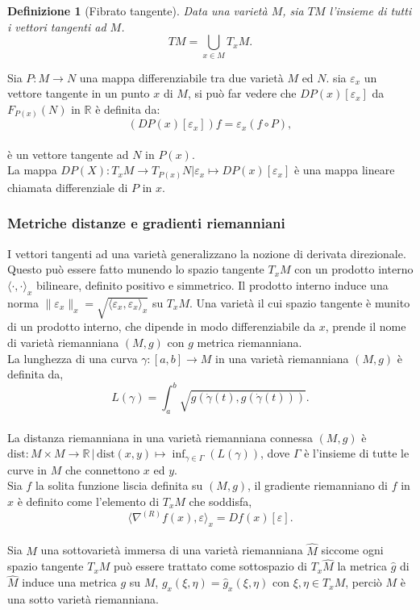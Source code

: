 \documentclass[a4paper, 12pt]{article}
\newtheorem{definition}{Definizione}
\begin{document}
\begin{definition}[Fibrato tangente]
Data una varietà $M$, sia $TM$ l'insieme di tutti i vettori tangenti ad $M$.\\
\[TM = \bigcup_{x \in M} T_xM.\]
\end{definition}
Sia $P:M \to N$ una mappa differenziabile tra due varietà $M$ ed $N$. sia $\varepsilon_x$ un vettore tangente in un punto $x$ di $M$, si può far vedere che $DP(x)[\varepsilon_x]$ da $F_{P(x)}(N)$ in $\mathbb{R}$ è definita da:\\
\[(DP(x)[\varepsilon_x])f = \varepsilon_x(f \circ P),\]\\
è un vettore tangente ad $N$ in $P(x)$.\\
La mappa $DP(X) : T_xM \to T_{P(x)}N | \varepsilon_x \mapsto DP(x)[\varepsilon_x]$ è una mappa lineare chiamata differenziale di $P$ in $x$.
\subsubsection{Metriche distanze e gradienti riemanniani}
I vettori tangenti ad una varietà generalizzano la nozione di derivata direzionale. Questo può essere fatto munendo lo spazio tangente $T_xM$ con un prodotto interno $\langle \cdot, \cdot \rangle_x$ bilineare, definito positivo e simmetrico. Il prodotto interno induce una norma $\| \varepsilon_x \|_x = \sqrt{\langle \varepsilon_x, \varepsilon_x \rangle_x}$ su $T_xM$. Una varietà il cui spazio tangente è munito di un prodotto interno, che dipende in modo differenziabile da $x$, prende il nome di varietà riemanniana $(M, g)$ con $g$ metrica riemanniana.\\
La lunghezza di una curva $\gamma:[a,b] \to M$ in una varietà riemanniana $(M, g)$ è definita da,\\
\[L(\gamma) = \int_a^b \sqrt{g(\dot{\gamma} (t), g(\dot{\gamma} (t)))}.\]\\
La distanza riemanniana in una varietà riemanniana connessa $(M,g)$ è $\mathrm{dist}: M \times M \to \mathbb{R} \, | \, \mathrm{dist}(x,y) \mapsto \inf_{\gamma \in \Gamma}(L(\gamma))$, dove $\Gamma$ è l'insieme di tutte le curve in $M$ che connettono $x$ ed $y$.\\
Sia $f$ la solita funzione liscia definita su $(M,g)$, il gradiente riemanniano di $f$ in $x$ è definito come l'elemento di $T_xM$ che soddisfa,\\
\[\langle \nabla^{(R)} f(x), \varepsilon \rangle_x = Df(x)[\varepsilon].\]\\
Sia $M$ una sottovarietà immersa di una varietà riemanniana $\widehat{M}$ siccome ogni spazio tangente $T_xM$ può essere trattato come sottospazio di $T_x\widehat{M}$ la metrica $\widehat{g}$ di $\widehat{M}$ induce una metrica $g$ su $M$, $g_x(\xi, \eta) = \widehat{g}_x(\xi, \eta)$ con $\xi, \eta \in T_xM$, perciò $M$ è una sotto varietà riemanniana.
\end{document}
